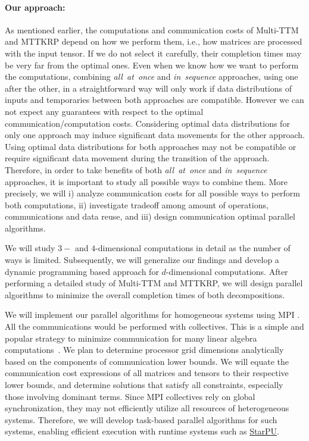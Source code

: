 \documentclass[a4paper,11pt, margin=2cm]{article}
\begin{document}
	
	
	
	\vspace*{-0.35cm}\paragraph{Our approach:} As mentioned earlier, the computations and communication costs of Multi-TTM and MTTKRP depend on how we perform them, i.e., how matrices are processed with the input tensor. If we do not select it carefully, their completion times may be very far from the optimal ones. Even when we know how we want to perform the computations, combining \emph{all~at~once} and \emph{in~sequence} approaches, using one after the other, in a straightforward way will only work if data distributions of inputs and temporaries between both approaches are compatible. However we can not expect any guarantees with respect to the optimal communication/computation costs. Considering optimal data distributions for only one approach may induce significant data movements for the other approach. Using optimal data distributions for both approaches may not be compatible or require significant data movement during the transition of the approach. Therefore, in order to take benefits of both \emph{all~at~once} and \emph{in~sequence} approaches, it is important to study all possible ways to combine them. More precisely, we will i) analyze communication costs for all possible ways to perform both computations, ii) investigate tradeoff among amount of operations, communications and data reuse, and iii) design communication optimal parallel algorithms.
	
	We will study $3-$ and $4$-dimensional computations in detail as the number of ways is limited. Subsequently, we will generalize our findings and develop a dynamic programming based approach for $d$-dimensional computations. After performing a detailed study of Multi-TTM and MTTKRP, we will design parallel algorithms to minimize the overall completion times of both decompositions.
	
	
	
	We will implement our parallel algorithms for homogeneous systems using MPI . All the communications would be performed with collectives. This is a simple and popular strategy to minimize communication for many linear algebra computations~\cite{ABK-IPDPS-2016}. We plan to determine processor grid dimensions analytically based on the components of communication lower bounds. We will equate the communication cost expressions of all matrices and tensors to their respective lower bounds, and determine solutions that satisfy all constraints, especially those involving dominant terms. 	Since MPI collectives rely on global synchronization, they may not efficiently utilize all resources of heterogeneous systems. Therefore, we will develop task-based parallel algorithms for such systems, enabling efficient execution with runtime systems such as \href{https://starpu.gitlabpages.inria.fr}{StarPU}.
	
\end{document}
